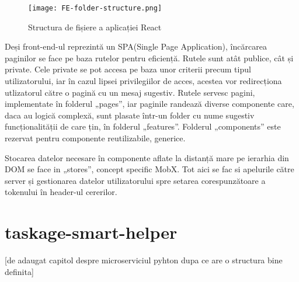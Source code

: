  \begin{figure}[ht]
	\centering
 	 \texttt{[image: FE-folder-structure.png]}
	\caption{Structura de fișiere a aplicației React}
	\label{FE-folder-structure}
 \end{figure}

Deși front-end-ul reprezintă un SPA(Single Page Application), încărcarea paginilor se face pe baza rutelor pentru eficiență. Rutele sunt atât publice, cât și private. Cele private se pot accesa pe baza unor criterii precum tipul utilizatorului, iar în cazul lipsei privilegiilor de acces, acestea vor redirecționa utlizatorul către o pagină cu un mesaj sugestiv. Rutele servesc pagini, implementate în folderul „pages”, iar paginile randează diverse componente care, daca au logică complexă, sunt plasate într-un folder cu nume sugestiv funcționalității de care țin, în folderul „features”. Folderul „components” este rezervat pentru componente reutilizabile, generice.

Stocarea datelor necesare în componente aflate la distanță mare pe ierarhia din DOM se face in „stores”, concept specific MobX. Tot aici se fac si apelurile către server și gestionarea datelor utilizatorului spre setarea corespunzătoare a tokenului în header-ul cererilor.

\section{taskage-smart-helper}

[de adaugat capitol despre microserviciul pyhton dupa ce are o structura bine definita]